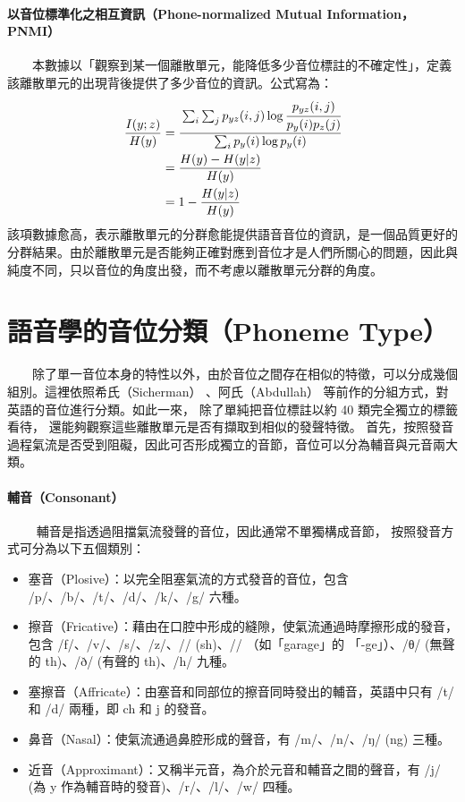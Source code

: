{\paragraph{以音位標準化之相互資訊（Phone-normalized Mutual Information，PNMI）}\hfill \break
%
　　本數據以「觀察到某一個離散單元，能降低多少音位標註的不確定性」，定義該離散單元的出現背後提供了多少音位的資訊。公式寫為：
\begin{align}
    \frac{I(y;z)}{H(y)} & =\cfrac{\sum_i \sum_j p_{yz}(i, j) \log \cfrac{p_{yz}(i, j)}{p_y(i)p_z(j)}}{\sum_i p_y(i) \log p_y(i)} \\
                        & =\frac{H(y)-H(y|z)}{H(y)}                                                                              \\
                        & =1-\frac{H(y|z)}{H(y)}
\end{align}
        該項數據愈高，表示離散單元的分群愈能提供語音音位的資訊，是一個品質更好的分群結果。由於離散單元是否能夠正確對應到音位才是人們所關心的問題，因此與純度不同，只以音位的角度出發，而不考慮以離散單元分群的角度。

\section{語音學的音位分類（Phoneme Type）}

　　除了單一音位本身的特性以外，由於音位之間存在相似的特徵，可以分成幾個組別。這裡依照希氏（Sicherman） \cite{10097097}、阿氏（Abdullah）\cite{abdullah23_interspeech} 等前作的分組方式，對英語的音位進行分類。如此一來，
除了單純把音位標註以約 40 類完全獨立的標籤看待，
還能夠觀察這些離散單元是否有擷取到相似的發聲特徵。
首先，按照發音過程氣流是否受到阻礙，因此可否形成獨立的音節，音位可以分為輔音與元音兩大類。

\paragraph{輔音（Consonant）} \hfill \break
%
　　
輔音是指透過阻擋氣流發聲的音位，因此通常不單獨構成音節，
按照發音方式可分為以下五個類別：
        
        \begin{itemize}
            \item 塞音（Plosive）：以完全阻塞氣流的方式發音的音位，包含 /p/、/b/、/t/、/d/、/k/、/g/ 六種。
            \item 擦音（Fricative）：藉由在口腔中形成的縫隙，使氣流通過時摩擦形成的發音，包含 /f/、/v/、/s/、/z/、/\textesh/ (sh)、/\textyogh/ （如「garage」的 「-ge」）、/θ/ (無聲的 th)、/ð/ (有聲的 th)、/h/ 九種。
            \item 塞擦音（Affricate）：由塞音和同部位的擦音同時發出的輔音，英語中只有 /t\textesh/ 和 /d\textyogh/ 兩種，即 ch 和 j 的發音。
            \item 鼻音（Nasal）：使氣流通過鼻腔形成的聲音，有 /m/、/n/、/ŋ/ (ng) 三種。
            \item 近音（Approximant）：又稱半元音，為介於元音和輔音之間的聲音，有 /j/ (為 y 作為輔音時的發音)、/r/、/l/、/w/ 四種。
        \end{itemize}

}
